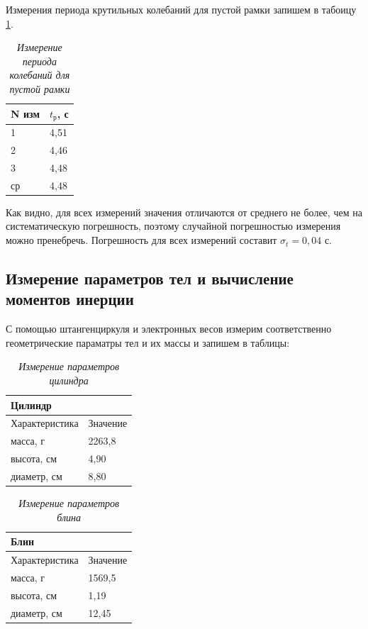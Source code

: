 \documentclass[a4paper,12pt]{article}
\begin{document}
Измерения периода крутильных колебаний для пустой рамки запишем в табоицу \ref{ramka}.

\begin{table}[!ht]
    \centering
    \begin{tabular}{|l|l|}
    \hline
        N изм  & $t_\text{р}$, с \\ \hline
        1  & 4,51  \\ \hline
        2  & 4,46 \\ \hline
        3  & 4,48  \\ \hline
        ср & 4,48  \\ \hline
    \end{tabular}\caption{\textit{Измерение периода колебаний для пустой рамки}}\label{ramka}
\end{table}

Как видно, для всех измерений значения отличаются от среднего не более, чем на систематическую погрешность, поэтому случайной погрешностью измерения можно пренебречь. Погрешность для всех измерений составит $\sigma_t = 0,04 \text{ с}$.

\subsection{Измерение параметров тел и вычисление моментов инерции}

С помощью штангенциркуля и электронных весов измерим соответственно геометрические параматры тел и их массы и запишем в таблицы:

\begin{table}[!ht]
    \centering
    \begin{tabular}{|l|l|}
    \hline
        \textbf{Цилиндр} & ~ \\ \hline
        Характеристика & Значение \\ \hline
        масса, г & 2263,8 \\ \hline
        высота, см & 4,90 \\ \hline
        диаметр, см & 8,80 \\ \hline
    \end{tabular}\caption{\textit{Измерение параметров цилиндра}}
\end{table}

\begin{table}[!ht]
    \centering
    \begin{tabular}{|l|l|}
    \hline
        \textbf{Блин} & ~ \\ \hline
        Характеристика & Значение \\ \hline
        масса, г & 1569,5 \\ \hline
        высота, см & 1,19 \\ \hline
        диаметр, см & 12,45 \\ \hline
    \end{tabular}\caption{\textit{Измерение параметров блина}}
\end{table}
\end{document}
